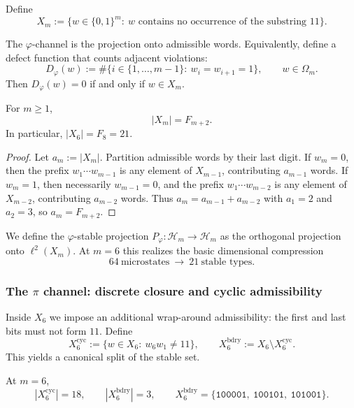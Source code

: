 \begin{definition}
\label{def:Xm}
Define
\[
X_m:=\{w\in\{0,1\}^m:\ \text{$w$ contains no occurrence of the substring $11$}\}.
\]
\end{definition}

The $\varphi$-channel is the projection onto admissible words.
Equivalently, define a defect function that counts adjacent violations:
\[
D_\varphi(w):=\#\{i\in\{1,\dots,m-1\}:\ w_i=w_{i+1}=1\},\qquad w\in\Omega_m.
\]
Then $D_\varphi(w)=0$ if and only if $w\in X_m$.

\begin{lemma}
\label{lem:Xm_fib_count}
For $m\ge 1$,
\[
|X_m|=F_{m+2}.
\]
In particular, $|X_6|=F_8=21$.
\end{lemma}

\begin{proof}
Let $a_m:=|X_m|$.
Partition admissible words by their last digit.
If $w_m=0$, then the prefix $w_1\cdots w_{m-1}$ is any element of $X_{m-1}$, contributing $a_{m-1}$ words.
If $w_m=1$, then necessarily $w_{m-1}=0$, and the prefix $w_1\cdots w_{m-2}$ is any element of $X_{m-2}$, contributing $a_{m-2}$ words.
Thus $a_m=a_{m-1}+a_{m-2}$ with $a_1=2$ and $a_2=3$, so $a_m=F_{m+2}$.
\end{proof}

We define the $\varphi$-stable projection $P_\varphi:\mathcal{H}_m\to \mathcal{H}_m$ as the orthogonal projection onto $\ell^2(X_m)$.
At $m=6$ this realizes the basic dimensional compression
\[
64\ \text{microstates}\ \longrightarrow\ 21\ \text{stable types}.
\]

\subsubsection{The \texorpdfstring{$\pi$}{pi} channel: discrete closure and cyclic admissibility}
\label{subsubsec:pi_channel}

Inside $X_6$ we impose an additional wrap-around admissibility: the first and last bits must not form $11$.
Define
\[
X^{\mathrm{cyc}}_6:=\{w\in X_6:\ w_6w_1\neq 11\},
\qquad
X^{\mathrm{bdry}}_6:=X_6\setminus X^{\mathrm{cyc}}_6.
\]
This yields a canonical split of the stable set.

\begin{proposition}
\label{prop:18_plus_3}
At $m=6$,
\[
|X^{\mathrm{cyc}}_6|=18,\qquad |X^{\mathrm{bdry}}_6|=3,
\qquad
X^{\mathrm{bdry}}_6=\{\texttt{100001},\ \texttt{100101},\ \texttt{101001}\}.
\]
\end{proposition}


